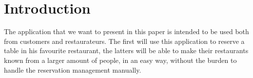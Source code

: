 \chapter{Introduction}
The application that we want to present in this paper is intended to be used
both from customers and restaurateurs. The first will use this application to
reserve a table in his favourite restaurant, the latters will be able to make
their restaurants known from a larger amount of people, in an easy way, without
the burden to handle the reservation management manually.

